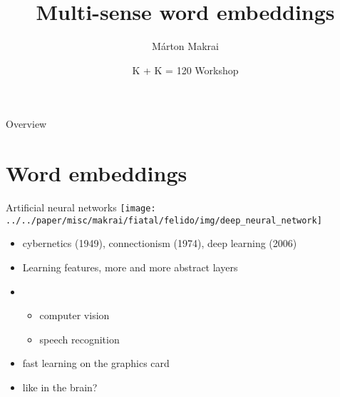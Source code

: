 \documentclass[10pt]{beamer}%
\title{%
  Multi-sense word embeddings}%
\author{Márton Makrai}
\date{K + K = 120 Workshop}
\begin{document}

\maketitle


\begin{frame}{Overview}
  \tableofcontents
\end{frame}


\section{Word embeddings}

\begin{frame}{Artificial neural networks}
\centering\texttt{[image: ../../paper/misc/makrai/fiatal/felido/img/deep\_neural\_network]}
  \begin{itemize}
    \item cybernetics (1949), connectionism (1974), deep learning (2006)
    \item Learning features, more and more abstract layers
    \item
      \begin{itemize}
        \item computer vision \citep{Krizhevsky:2012}
        \item speech recognition \citep{Hinton:2012}
      \end{itemize}
    \item fast learning on the graphics card
    \item like in the brain?
  \end{itemize}
\end{frame}
\end{document}

